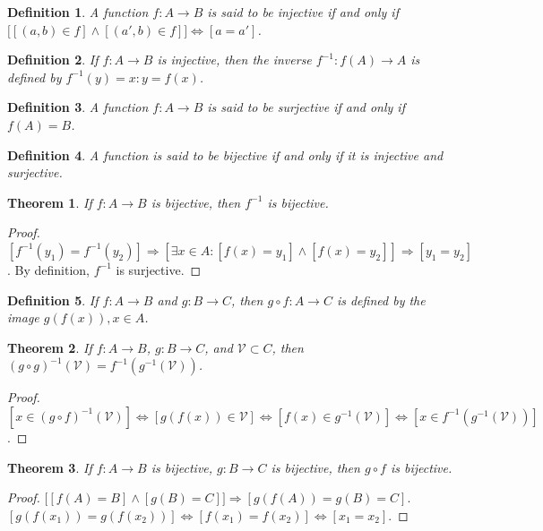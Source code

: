 \documentclass[12pt,oneside]{book}
\theoremstyle{mystyle}
\newtheorem{theorem}{Theorem}[section]
\newtheorem{definition}{Definition}[section]
\begin{document}
\begin{definition}
A function $f:A\rightarrow B$ is said to be injective if and only if $\big[[(a,b)\in f]\land[(a',b)\in f]\big]\Leftrightarrow [a=a']$.
\end{definition}

\begin{definition}
If $f:A\rightarrow B$ is injective, then the inverse $f^{-1}:f(A)\rightarrow A$ is defined by $f^{-1}(y)=x:y=f(x)$.
\end{definition}

\begin{definition}
A function $f:A\rightarrow B$ is said to be surjective if and only if $f(A) = B$.
\end{definition}

\begin{definition}
A function is said to be bijective if and only if it is injective and surjective.
\end{definition}

\begin{theorem}
If $f:A\rightarrow B$ is bijective, then $f^{-1}$ is bijective.
\end{theorem}
\begin{proof}
$[f^{-1}(y_1) = f^{-1}(y_2)]\Rightarrow [\exists x\in A:[f(x) = y_1]\land [f(x)=y_2]]\Rightarrow [y_1=y_2]$. By definition, $f^{-1}$ is surjective.
\end{proof}

\begin{definition}
If $f:A\rightarrow B$ and $g:B\rightarrow C$, then $g\circ f:A\rightarrow C$ is defined by the image $g(f(x)), x\in A$. 
\end{definition}

\begin{theorem}
If $f:A\rightarrow B$, $g:B\rightarrow C$, and $\mathcal{V}\subset C$, then $(g\circ g)^{-1}(\mathcal{V}) = f^{-1}(g^{-1}(\mathcal{V}))$.
\end{theorem}
\begin{proof}
$[x\in (g\circ f)^{-1}(\mathcal{V})]\Leftrightarrow [g(f(x))\in \mathcal{V}] \Leftrightarrow [f(x)\in g^{-1}(\mathcal{V})]\Leftrightarrow [x\in f^{-1}(g^{-1}(\mathcal{V}))]$.
\end{proof}

\begin{theorem}
If $f:A\rightarrow B$ is bijective, $g:B\rightarrow C$ is bijective, then $g\circ f$ is bijective.
\end{theorem}
\begin{proof}
$\big[[f(A) = B]\land [g(B) = C]\big]\Rightarrow [g(f(A)) = g(B) = C]$. $[g(f(x_1))=g(f(x_2))]\Leftrightarrow [f(x_1)=f(x_2)]\Leftrightarrow [x_1=x_2]$.
\end{proof}
\end{document}

